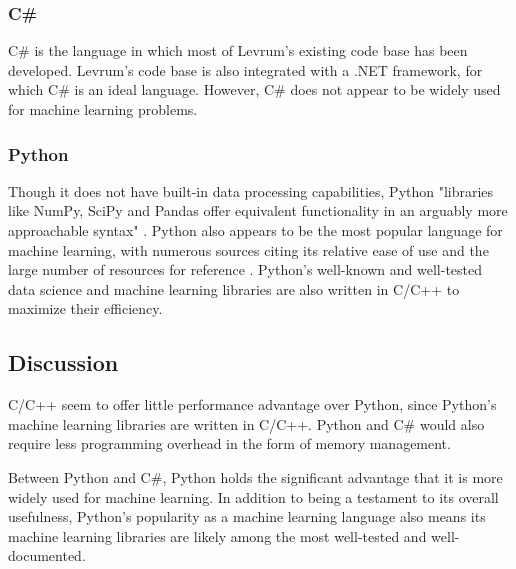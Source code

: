 \documentclass[onecolumn, draftclsnofoot,10pt, compsoc]{IEEEtran}
\begin{document}
        \subsubsection{C\#}
        C\# is the language in which most of Levrum's existing code base has been developed.
        Levrum's code base is also integrated with a .NET framework, for which C\# is an ideal language.
        However, C\# does not appear to be widely used for machine learning problems.
        
        \subsubsection{Python}
        Though it does not have built-in data processing capabilities, Python "libraries like NumPy, SciPy and Pandas offer equivalent functionality in an arguably more approachable syntax" \cite{UdacityChakra}. 
        Python also appears to be the most popular language for machine learning, with numerous sources citing its relative ease of use and the large number of resources for reference \cite{ValueWalk} \cite{HackerEarth} \cite{Intellipaat}.
        Python's well-known and well-tested data science and machine learning libraries are also written in C/C++ to maximize their efficiency.
    
    \subsection{Discussion}
    C/C++ seem to offer little performance advantage over Python, since Python's machine learning libraries are written in C/C++. 
    Python and C\# would also require less programming overhead in the form of memory management. 
    
    Between Python and C\#, Python holds the significant advantage that it is more widely used for machine learning. In addition to being a testament to its overall usefulness, Python's popularity as a machine learning language also means its machine learning libraries are likely among the most well-tested and well-documented.
    
\end{document}
